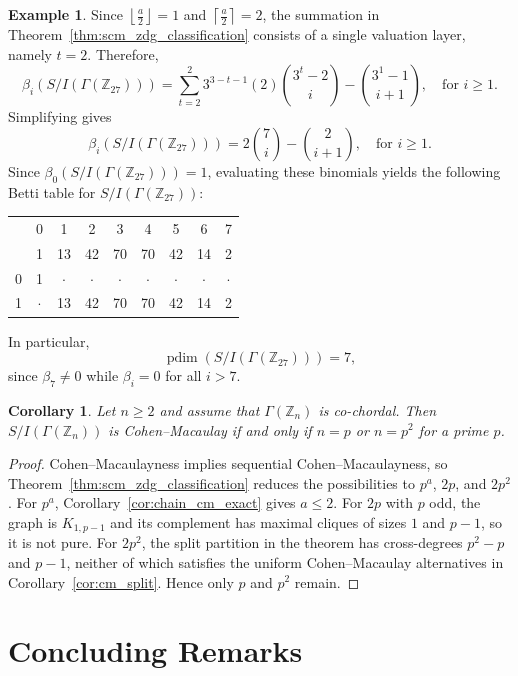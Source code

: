 \documentclass[12pt, reqno]{amsart}
\newtheorem{corollary}[theorem]{Corollary}
\theoremstyle{definition}
\newtheorem{example}[theorem]{Example}
\numberwithin{equation}{section}
\begin{document}
\begin{example}
		Since $\left\lfloor \frac{a}{2}\right\rfloor =1$ and $\left\lceil \frac{a}{2}\right\rceil =2$, the summation in Theorem~\ref{thm:scm_zdg_classification} consists of a single valuation layer, namely $t=2$. Therefore,
		\[
		\beta_i(S/I(\Gamma(\mathbb Z_{27}))) = \sum_{t=2}^{2} 3^{3-t-1}(2) \binom{3^t - 2}{i} - \binom{3^1 - 1}{i+1}, \quad \text{for } i \ge1.
		\]
		Simplifying gives
		\[
		\beta_i(S/I(\Gamma(\mathbb Z_{27}))) = 2\binom{7}{i} - \binom{2}{i+1}, \quad \text{for } i \ge1.
		\]
		Since $\beta_0(S/I(\Gamma(\mathbb Z_{27})))=1$, evaluating these binomials yields the following Betti table for $S/I(\Gamma(\mathbb Z_{27}))$:
		\begin{center}
			\begin{tabular}{r|cccccccc} 
				& 0 & 1 & 2 & 3 & 4 & 5 & 6 & 7 \\
				\text{total:} & 1 & 13 & 42 & 70 & 70 & 42 & 14 & 2 \\\hline
				0 & 1 & $\cdot$ & $\cdot$ & $\cdot$ & $\cdot$ & $\cdot$ & $\cdot$ & $\cdot$ \\
				1 & $\cdot$ & 13 & 42 & 70 & 70 & 42 & 14 & 2
			\end{tabular}
		\end{center}
		In particular,
		\[
		\operatorname{pdim}(S/I(\Gamma(\mathbb Z_{27})))=7,
		\]
		since $\beta_7\neq0$ while $\beta_i=0$ for all $i>7$.
	\end{example}
	
	\begin{corollary}
Let $n\ge2$ and assume that $\Gamma(\mathbb Z_n)$ is co-chordal.  Then $S/I(\Gamma(\mathbb Z_n))$ is Cohen--Macaulay if and only if $n=p$ or $n=p^2$ for a prime $p$.
\end{corollary}
\begin{proof}
Cohen--Macaulayness implies sequential Cohen--Macaulayness, so Theorem~\ref{thm:scm_zdg_classification} reduces the possibilities to $p^a$, $2p$, and $2p^2$.  For $p^a$, Corollary~\ref{cor:chain_cm_exact} gives $a\le2$.  For $2p$ with $p$ odd, the graph is $K_{1,p-1}$ and its complement has maximal cliques of sizes $1$ and $p-1$, so it is not pure.  For $2p^2$, the split partition in the theorem has cross-degrees $p^2-p$ and $p-1$, neither of which satisfies the uniform Cohen--Macaulay alternatives in Corollary~\ref{cor:cm_split}.  Hence only $p$ and $p^2$ remain.
\end{proof}
	
	\section{Concluding Remarks}\label{sec:conclusion}
\end{document}
